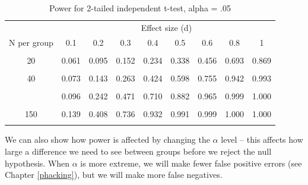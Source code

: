\documentclass{krantz}
\begin{document}
\begin{table}

\caption{\label{tab:powertable}Power for 2-tailed independent t-test, alpha = .05}
\centering
\begin{tabular}[t]{ccccccccc}
\toprule
\multicolumn{1}{c}{ } & \multicolumn{8}{c}{Effect size (d)} \\
\cmidrule(l{3pt}r{3pt}){2-9}
N per group & 0.1 & 0.2 & 0.3 & 0.4 & 0.5 & 0.6 & 0.8 & 1\\
\midrule
\cellcolor{gray!6}{10} & \cellcolor{gray!6}{0.055} & \cellcolor{gray!6}{0.071} & \cellcolor{gray!6}{0.097} & \cellcolor{gray!6}{0.135} & \cellcolor{gray!6}{0.185} & \cellcolor{gray!6}{0.246} & \cellcolor{gray!6}{0.395} & \cellcolor{gray!6}{0.562}\\
20 & 0.061 & 0.095 & 0.152 & 0.234 & 0.338 & 0.456 & 0.693 & 0.869\\
\cellcolor{gray!6}{30} & \cellcolor{gray!6}{0.067} & \cellcolor{gray!6}{0.119} & \cellcolor{gray!6}{0.208} & \cellcolor{gray!6}{0.332} & \cellcolor{gray!6}{0.478} & \cellcolor{gray!6}{0.628} & \cellcolor{gray!6}{0.861} & \cellcolor{gray!6}{0.968}\\
40 & 0.073 & 0.143 & 0.263 & 0.424 & 0.598 & 0.755 & 0.942 & 0.993\\
\cellcolor{gray!6}{50} & \cellcolor{gray!6}{0.079} & \cellcolor{gray!6}{0.168} & \cellcolor{gray!6}{0.318} & \cellcolor{gray!6}{0.508} & \cellcolor{gray!6}{0.697} & \cellcolor{gray!6}{0.844} & \cellcolor{gray!6}{0.977} & \cellcolor{gray!6}{0.999}\\
\addlinespace
80 & 0.096 & 0.242 & 0.471 & 0.710 & 0.882 & 0.965 & 0.999 & 1.000\\
\cellcolor{gray!6}{100} & \cellcolor{gray!6}{0.108} & \cellcolor{gray!6}{0.291} & \cellcolor{gray!6}{0.560} & \cellcolor{gray!6}{0.804} & \cellcolor{gray!6}{0.940} & \cellcolor{gray!6}{0.988} & \cellcolor{gray!6}{1.000} & \cellcolor{gray!6}{1.000}\\
150 & 0.139 & 0.408 & 0.736 & 0.932 & 0.991 & 0.999 & 1.000 & 1.000\\
\cellcolor{gray!6}{200} & \cellcolor{gray!6}{0.169} & \cellcolor{gray!6}{0.514} & \cellcolor{gray!6}{0.849} & \cellcolor{gray!6}{0.979} & \cellcolor{gray!6}{0.999} & \cellcolor{gray!6}{1.000} & \cellcolor{gray!6}{1.000} & \cellcolor{gray!6}{1.000}\\
\bottomrule
\end{tabular}
\end{table}

We can also show how power is affected by changing the \(\alpha\) level -- this affects how large a difference we need to see between groups before we reject the null hypothesis. When \(\alpha\) is more extreme, we will make fewer false positive errors (see Chapter \ref{phacking}), but we will make more false negatives.
\end{document}
